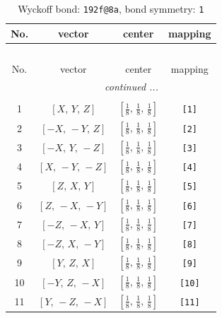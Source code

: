 \documentclass[fleqn,8pt]{jsarticle}
\begin{document}
\begin{longtable}{cccc}
\caption{Wyckoff bond: {\tt 192f@8a}, bond symmetry: {\tt 1}}
 \\
 \hline \hline
No. & vector & center & mapping \\ \hline \endfirsthead

\multicolumn{3}{l}{\tablename\ \thetable{}} \\
 \hline \hline
No. & vector & center & mapping \\ \hline \endhead

 \hline \hline
\multicolumn{3}{r}{\footnotesize\it continued ...} \\ \endfoot

 \hline \hline
\multicolumn{3}{r}{} \\ \endlastfoot

1 & $\left[ X,\, Y,\, Z \right]$ & $\left[ \frac{1}{8},\, \frac{1}{8},\, \frac{1}{8} \right]$ & {\tt [1]} \\ \hline
2 & $\left[ - X,\, - Y,\, Z \right]$ & $\left[ \frac{1}{8},\, \frac{1}{8},\, \frac{1}{8} \right]$ & {\tt [2]} \\ \hline
3 & $\left[ - X,\, Y,\, - Z \right]$ & $\left[ \frac{1}{8},\, \frac{1}{8},\, \frac{1}{8} \right]$ & {\tt [3]} \\ \hline
4 & $\left[ X,\, - Y,\, - Z \right]$ & $\left[ \frac{1}{8},\, \frac{1}{8},\, \frac{1}{8} \right]$ & {\tt [4]} \\ \hline
5 & $\left[ Z,\, X,\, Y \right]$ & $\left[ \frac{1}{8},\, \frac{1}{8},\, \frac{1}{8} \right]$ & {\tt [5]} \\ \hline
6 & $\left[ Z,\, - X,\, - Y \right]$ & $\left[ \frac{1}{8},\, \frac{1}{8},\, \frac{1}{8} \right]$ & {\tt [6]} \\ \hline
7 & $\left[ - Z,\, - X,\, Y \right]$ & $\left[ \frac{1}{8},\, \frac{1}{8},\, \frac{1}{8} \right]$ & {\tt [7]} \\ \hline
8 & $\left[ - Z,\, X,\, - Y \right]$ & $\left[ \frac{1}{8},\, \frac{1}{8},\, \frac{1}{8} \right]$ & {\tt [8]} \\ \hline
9 & $\left[ Y,\, Z,\, X \right]$ & $\left[ \frac{1}{8},\, \frac{1}{8},\, \frac{1}{8} \right]$ & {\tt [9]} \\ \hline
10 & $\left[ - Y,\, Z,\, - X \right]$ & $\left[ \frac{1}{8},\, \frac{1}{8},\, \frac{1}{8} \right]$ & {\tt [10]} \\ \hline
11 & $\left[ Y,\, - Z,\, - X \right]$ & $\left[ \frac{1}{8},\, \frac{1}{8},\, \frac{1}{8} \right]$ & {\tt [11]} \\ \hline

\end{longtable}
\end{document}
